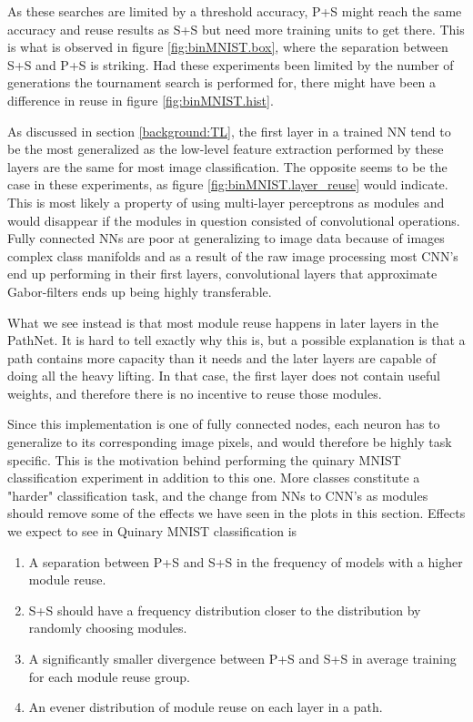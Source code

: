 As these searches are limited by a threshold accuracy, P+S might reach the same accuracy and reuse results as S+S but need more training units to get there. This is what is observed in figure \ref{fig:binMNIST.box}, where the separation between S+S and P+S is striking. Had these experiments been limited by the number of generations the tournament search is performed for, there might have been a difference in reuse in figure \ref{fig:binMNIST.hist}.

As discussed in section \ref{background:TL}, the first layer in a trained NN tend to be the most generalized as the low-level feature extraction performed by these layers are the same for most image classification. The opposite seems to be the case in these experiments, as figure \ref{fig:binMNIST.layer_reuse} would indicate. This is most likely a property of using multi-layer perceptrons as modules and would disappear if the modules in question consisted of convolutional operations. Fully connected NNs are poor at generalizing to image data because of images complex class manifolds and as a result of the raw image processing most CNN's end up performing in their first layers, convolutional layers that approximate Gabor-filters ends up being highly transferable\cite{yosinski2014transferable}.

What we see instead is that most module reuse happens in later layers in the PathNet. It is hard to tell exactly why this is, but a possible explanation is that a path contains more capacity than it needs and the later layers are capable of doing all the heavy lifting. In that case, the first layer does not contain useful weights, and therefore there is no incentive to reuse those modules. 

Since this implementation is one of fully connected nodes, each neuron has to generalize to its corresponding image pixels, and would therefore be highly task specific. This is the motivation behind performing the quinary MNIST classification experiment in addition to this one. More classes constitute a "harder" classification task, and the change from NNs to CNN's as modules should remove some of the effects we have seen in the plots in this section. Effects we expect to see in Quinary MNIST classification is

\begin{enumerate}
    \item A separation between P+S and S+S in the frequency of models with a higher module reuse.
    \item S+S should have a frequency distribution closer to the distribution by randomly choosing modules.
    \item A significantly smaller divergence between P+S and S+S in average training for each module reuse group. 
    \item An evener distribution of module reuse on each layer in a path.
\end{enumerate}

